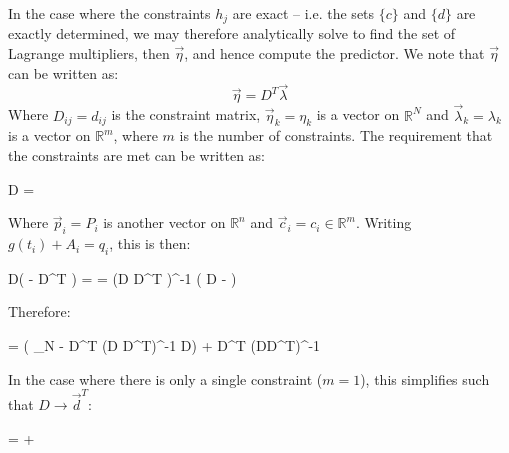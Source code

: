 \documentclass[]{article}
\begin{document}
			In the case where the constraints $h_j$ are exact -- i.e. the sets $\{c\}$ and $\{d\}$ are exactly determined, we may therefore analytically solve to find the set of Lagrange multipliers, then $\vec{\eta}$, and hence compute the predictor. We note that $\vec{\eta}$ can be written as:
			\begin{equation}
				\vec{\eta} = D^T \vec{\lambda}
			\end{equation}
			Where $D_{ij} = d_{ij}$ is the constraint matrix, $\vec{\eta}_k = \eta_k$ is a vector on $\mathbb{R}^N$ and $\vec{\lambda}_k = \lambda_k$ is a vector on $\mathbb{R}^m$, where $m$ is the number of constraints. The requirement that the constraints are met can be written as:
			\begin{spalign}
				D  = 
			\end{spalign} 
			Where $\vec{p}_i = P_i$ is another vector on $\mathbb{R}^n$ and $\vec{c}_i = c_i \in \mathbb{R}^m$. Writing $g(t_i) + A_i = q_i$, this is then:
			\begin{spalign}
				D\left( -  D^T \vec{\lambda} \right) =  \LLR \vec{\lambda} =  \left(D D^T \right)^{-1} \left( D  - \vec{c} \right)
			\end{spalign}
			Therefore:
			\begin{spalign}
				 =  \left( _N - D^T (D D^T)^{-1} D\right) + D^T (DD^T)^{-1}  \label{E:ConstrainedSolution}
			\end{spalign}
			In the case where there is only a single constraint ($m=1$), this simplifies such that $D \to \vec{d}^T$:
			\begin{spalign}
				 = \vec{q} + \frac{c - \cdot \vec{d}}{\vec{d}^2} \vec{d} 
			\end{spalign}
\end{document}
